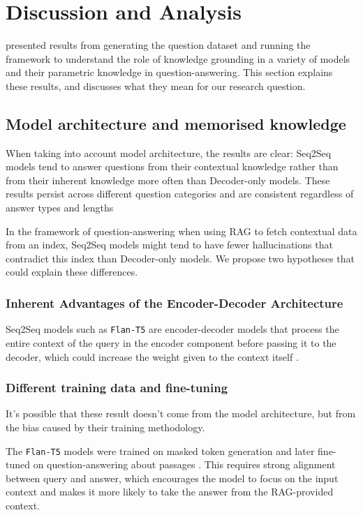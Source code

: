 \section{Discussion and Analysis}
\label{discussion}

 presented results from generating the question dataset and running the framework to understand the role of knowledge grounding in a variety of models and their parametric knowledge in question-answering.
This section explains these results, and discusses what they mean for our research question.

\subsection{Model architecture and memorised knowledge}
\label{model_architecture_parametric}

When taking into account model architecture, the results are clear: Seq2Seq models tend to answer questions from their contextual knowledge rather than from their inherent knowledge more often than Decoder-only models.
These results persist across different question categories and are consistent regardless of answer types and lengths

In the framework of question-answering when using RAG to fetch contextual data from an index, Seq2Seq models might tend to have fewer hallucinations that contradict this index than Decoder-only models.
We propose two hypotheses that could explain these differences.

\subsubsection{Inherent Advantages of the Encoder-Decoder Architecture}

Seq2Seq models such as \texttt{Flan-T5} are encoder-decoder models that process the entire context of the query in the encoder component before passing it to the decoder, which could increase the weight given to the context itself \cite{flant5}.

\subsubsection{Different training data and fine-tuning}

It's possible that these result doesn't come from the model architecture, but from the bias caused by their training methodology.

The \texttt{Flan-T5} models were trained on masked token generation and later fine-tuned on question-answering about passages \cite{flant5}.
This requires strong alignment between query and answer, which encourages the model to focus on the input context and makes it more likely to take the answer from the RAG-provided context.

